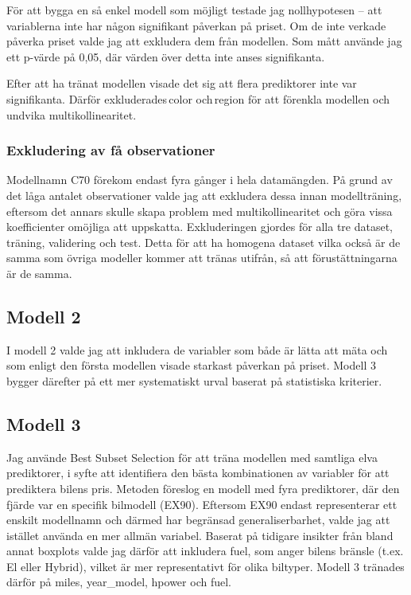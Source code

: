 \documentclass[
  letterpaper,
  DIV=11,
  numbers=noendperiod]{scrreprt}
\begin{document}
För att bygga en så enkel modell som möjligt testade jag nollhypotesen
-- att variablerna inte har någon signifikant påverkan på priset. Om de
inte verkade påverka priset valde jag att exkludera dem från modellen.
Som mått använde jag ett p-värde på 0,05, där värden över detta inte
anses signifikanta.

Efter att ha tränat modellen visade det sig att flera prediktorer inte
var signifikanta. Därför exkluderades\,color och\,region för att
förenkla modellen och undvika multikollinearitet.

\subsubsection{Exkludering av få
observationer}\label{exkludering-av-fuxe5-observationer}

Modellnamn C70 förekom endast fyra gånger i hela datamängden. På grund
av det låga antalet observationer valde jag att exkludera dessa innan
modellträning, eftersom det annars skulle skapa problem med
multikollinearitet och göra vissa koefficienter omöjliga att uppskatta.
Exkluderingen gjordes för alla tre dataset, träning, validering och
test. Detta för att ha homogena dataset vilka också är de samma som
övriga modeller kommer att tränas utifrån, så att förustättningarna är
de samma.

\subsection{Modell 2}\label{modell-2}

I modell 2 valde jag att inkludera de variabler som både är lätta att
mäta och som enligt den första modellen visade starkast påverkan på
priset. Modell 3 bygger därefter på ett mer systematiskt urval baserat
på statistiska kriterier.

\subsection{Modell 3}\label{modell-3}

Jag använde Best Subset Selection för att träna modellen med samtliga
elva prediktorer, i syfte att identifiera den bästa kombinationen av
variabler för att prediktera bilens pris. Metoden föreslog en modell med
fyra prediktorer, där den fjärde var en specifik bilmodell (EX90).
Eftersom EX90 endast representerar ett enskilt modellnamn och därmed har
begränsad generaliserbarhet, valde jag att istället använda en mer
allmän variabel. Baserat på tidigare insikter från bland annat boxplots
valde jag därför att inkludera fuel, som anger bilens bränsle (t.ex. El
eller Hybrid), vilket är mer representativt för olika biltyper. Modell 3
tränades därför på miles, year\_model, hpower och fuel.
\end{document}
